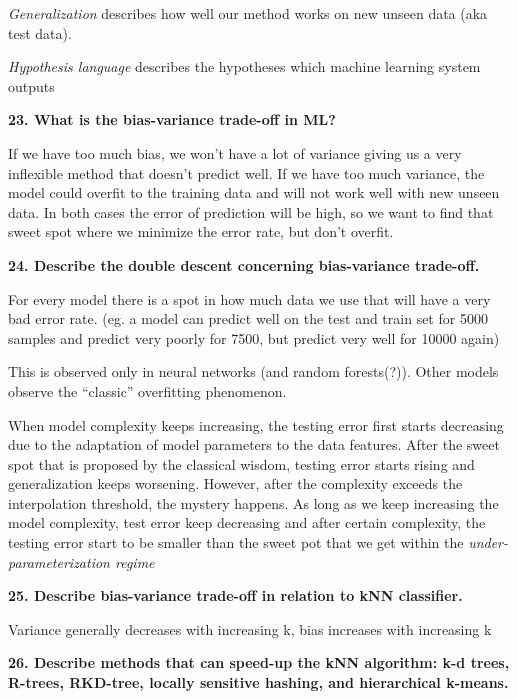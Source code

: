 \textit{Generalization} describes how well our method works on new
unseen data (aka test data).

\textit{Hypothesis language} describes the hypotheses which machine
learning system outputs

\textbf{23. What is the bias-variance trade-off in ML?}

If we have too much bias, we won't have a lot of variance giving us a
very inflexible method that doesn't predict well. If we have too much
variance, the model could overfit to the training data and will not work
well with new unseen data. In both cases the error of prediction will be
high, so we want to find that sweet spot where we minimize the error
rate, but don't overfit.

\textbf{24. Describe the double descent concerning bias-variance
trade-off.}

For every model there is a spot in how much data we use that will have a
very bad error rate. (eg. a model can predict well on the test and train
set for 5000 samples and predict very poorly for 7500, but predict very
well for 10000 again)

This is observed only in neural networks (and random forests(?)). Other
models observe the ``classic'' overfitting phenomenon.


When model complexity keeps increasing, the testing error first starts
decreasing due to the adaptation of model parameters to the data
features. After the sweet spot that is proposed by the classical wisdom,
testing error starts rising and generalization keeps worsening. However,
after the complexity exceeds the interpolation threshold, the mystery
happens. As long as we keep increasing the model complexity, test error
keep decreasing and after certain complexity, the testing error start to
be smaller than the sweet pot that we get within the
\textit{under-parameterization regime}


\textbf{25. Describe bias-variance trade-off in relation to kNN
classifier.}

Variance generally decreases with increasing k, bias increases with
increasing k

\textbf{26. Describe methods that can speed-up the kNN algorithm: k-d
trees, R-trees, RKD-tree, locally sensitive hashing, and hierarchical
k-means.}

